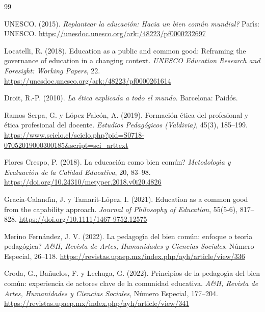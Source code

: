 \documentclass[12pt,letterpaper]{article}
\begin{document}
\begin{thebibliography}{99}

UNESCO. (2015). \emph{Replantear la educaci\'on: \textquestiondown Hacia un bien com\'un mundial?} Par\'{\i}s: UNESCO. \url{https://unesdoc.unesco.org/ark:/48223/pf0000232697}

Locatelli, R. (2018). Education as a public and common good: Reframing the governance of education in a changing context. \emph{UNESCO Education Research and Foresight: Working Papers}, 22. \url{https://unesdoc.unesco.org/ark:/48223/pf0000261614}

Droit, R.-P. (2010). \emph{La \'etica explicada a todo el mundo}. Barcelona: Paid\'os.

Ramos Serpa, G. y L\'opez Falc\'on, A. (2019). Formaci\'on \'etica del profesional y \'etica profesional del docente. \emph{Estudios Pedag\'ogicos (Valdivia)}, 45(3), 185--199. \url{https://www.scielo.cl/scielo.php?pid=S0718-07052019000300185\&script=sci_arttext}

Flores Crespo, P. (2018). \textquestiondown La educaci\'on como bien com\'un? \emph{Metodolog\'{\i}a y Evaluaci\'on de la Calidad Educativa}, 20, 83--98. \url{https://doi.org/10.24310/metyper.2018.v0i20.4826}

Gracia-Caland\'{\i}n, J. y Tamarit-L\'opez, I. (2021). Education as a common good from the capability approach. \emph{Journal of Philosophy of Education}, 55(5-6), 817--828. \url{https://doi.org/10.1111/1467-9752.12575}

Merino Fern\'andez, J. V. (2022). La pedagog\'{\i}a del bien com\'un: \textquestiondown enfoque o teor\'{\i}a pedag\'ogica? \emph{A\&H, Revista de Artes, Humanidades y Ciencias Sociales}, N\'umero Especial, 26--118. \url{https://revistas.upaep.mx/index.php/ayh/article/view/336}

Croda, G., Ba\~nuelos, F. y Lechuga, G. (2022). Principios de la pedagog\'{\i}a del bien com\'un: experiencia de actores clave de la comunidad educativa. \emph{A\&H, Revista de Artes, Humanidades y Ciencias Sociales}, N\'umero Especial, 177--204. \url{https://revistas.upaep.mx/index.php/ayh/article/view/341}


\end{thebibliography}
\end{document}
